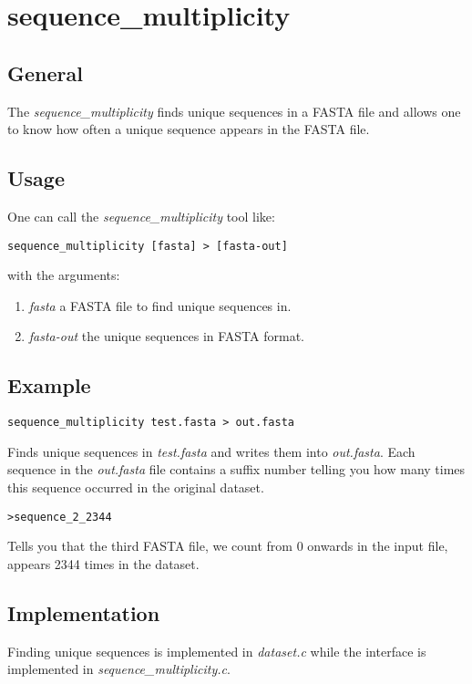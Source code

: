 \section{sequence\_multiplicity} \label{sec-seqmult}

\subsection{General}

The \emph{sequence\_multiplicity} finds unique sequences in a FASTA file and
allows one to know how often a unique sequence appears in the FASTA
file.

\subsection{Usage}

One can call the \emph{sequence\_multiplicity} tool like:
\begin{lstlisting}
sequence_multiplicity [fasta] > [fasta-out]
\end{lstlisting}
with the arguments:
\begin{enumerate}
\item \emph{fasta} a FASTA file to find unique sequences in.
\item \emph{fasta-out} the unique sequences in FASTA format.
\end{enumerate}

\subsection{Example}
\begin{lstlisting}
sequence_multiplicity test.fasta > out.fasta
\end{lstlisting}
Finds unique sequences in \emph{test.fasta} and writes them into
\emph{out.fasta}. Each sequence in the \emph{out.fasta} file contains
a suffix number telling you how many times this sequence occurred in
the original dataset. 
\begin{lstlisting}
>sequence_2_2344 
\end{lstlisting}
Tells you that the third FASTA file, we count from 0 onwards in the
input file, appears 2344 times in the dataset.  

\subsection{Implementation}
Finding unique sequences is implemented in \emph{dataset.c} while
the interface is implemented in \emph{sequence\_multiplicity.c}. 
